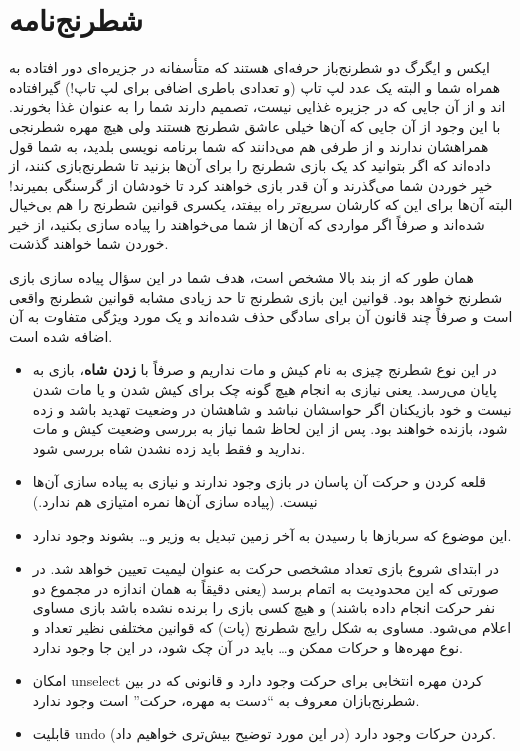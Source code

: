 \documentclass[]{article}
\begin{document}
\section{‌شطرنج‌نامه}

ایکس و ایگرگ دو شطرنج‌باز حرفه‌ای هستند که متأسفانه در جزیره‌ای دور افتاده به همراه شما و البته یک عدد لپ تاپ (و تعدادی باطری اضافی برای لپ تاپ!) گیرافتاده اند و از آن جایی که در جزیره غذایی نیست، تصمیم دارند شما را به عنوان غذا بخورند. با این وجود از آن جایی که آن‌ها خیلی عاشق شطرنج هستند ولی هیچ مهره شطرنجی همراهشان ندارند و از طرفی هم می‌دانند که شما برنامه نویسی بلدید، به شما قول داده‌اند که اگر بتوانید کد یک بازی شطرنج را برای آن‌ها بزنید تا شطرنج‌بازی کنند، از خیر خوردن شما می‌گذرند و آن قدر بازی خواهند کرد تا خودشان از گرسنگی بمیرند! البته آن‌ها برای این که کارشان سریع‌تر راه بیفتد،‌ یکسری قوانین شطرنج را هم بی‌خیال شده‌اند و صرفاً اگر مواردی که آن‌ها از شما می‌خواهند را پیاده سازی بکنید،‌ از خیر خوردن شما خواهند گذشت.

\hrulefill
\hrulefill

همان طور که از بند بالا مشخص است، هدف شما در این سؤال پیاده سازی بازی شطرنج خواهد بود. قوانین این بازی شطرنج تا حد زیادی مشابه قوانین شطرنج واقعی است و صرفاً چند قانون آن برای سادگی حذف شده‌اند و یک مورد ویژگی متفاوت به آن اضافه شده است.

\begin{itemize}

\item در این نوع شطرنج چیزی به نام کیش و مات نداریم و صرفاً با \textbf{زدن شاه}، بازی به پایان می‌رسد. یعنی نیازی به انجام هیچ گونه چک برای کیش شدن و یا مات شدن نیست و خود بازیکنان اگر حواسشان نباشد و شاهشان در وضعیت تهدید باشد و زده شود، بازنده خواهند بود. پس از این لحاظ شما نیاز به بررسی وضعیت کیش و مات ندارید و فقط باید زده نشدن شاه بررسی شود.

\item قلعه کردن و حرکت آن پاسان در بازی وجود ندارند و نیازی به پیاده سازی آن‌ها نیست. (پیاده سازی آن‌ها نمره امتیازی هم ندارد.)


\item این موضوع که سربازها با رسیدن به آخر زمین تبدیل به وزیر و… بشوند وجود ندارد.

\item در ابتدای شروع بازی تعداد مشخصی حرکت به عنوان لیمیت تعیین خواهد شد. در صورتی که این محدودیت به اتمام برسد (یعنی دقیقاً به همان اندازه در مجموع دو نفر حرکت انجام داده باشند) و هیچ کسی بازی را برنده نشده باشد بازی مساوی اعلام می‌شود. مساوی به شکل رایج شطرنج (پات) که قوانین مختلفی نظیر تعداد و نوع مهره‌ها و حرکات ممکن و… باید در آن چک شود، در این جا وجود ندارد.

\item امکان unselect کردن مهره انتخابی برای حرکت وجود دارد و قانونی که در بین شطرنج‌بازان معروف به “دست به مهره، حرکت” است وجود ندارد.

\item قابلیت undo کردن حرکات وجود دارد (در این مورد توضیح بیش‌تری خواهیم داد).

\end{itemize}
\end{document}
